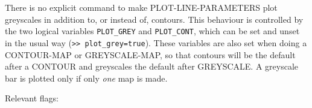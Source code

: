 \documentclass[11pt,twoside]{report}
\begin{document}
There is no explicit command to make PLOT-LINE-PARAMETERS plot greyscales in
addition to, or instead of, contours. This behaviour is controlled by the two
logical variables \verb+PLOT_GREY+ and \verb+PLOT_CONT+, which can be set and
unset in the usual way (\eg \verb+>> plot_grey=true+). These variables are also
set when doing a CONTOUR-MAP or GREYSCALE-MAP, so that contours will be the
default after a CONTOUR and greyscales the default after GREYSCALE. A greyscale
bar is plotted only if only {\em one} map is made.

Relevant flags:\\
\end{document}
